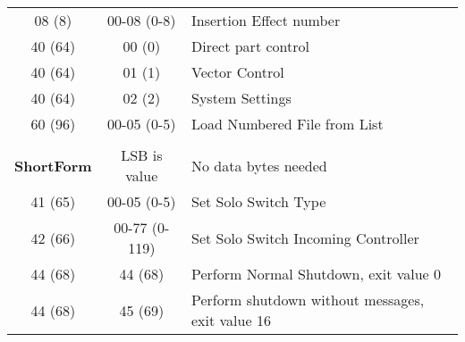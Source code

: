 \begin{table}[H]
\begin{tabular}{c c l}
        08 (8) & 00-08 (0-8)& Insertion Effect number \\
        40 (64) & 00 (0) & Direct part control \\
        40 (64) & 01 (1) & Vector Control \\
        40 (64) & 02 (2) & System Settings \\
        60 (96) & 00-05 (0-5) & Load Numbered File from List \\
        \\
    \textbf{ShortForm} &  LSB is value & No data bytes needed \\
        41 (65) & 00-05 (0-5) & Set Solo Switch Type \\
        42 (66) & 00-77 (0-119) & Set Solo Switch Incoming Controller \\
        44 (68) & 44 (68) & Perform Normal Shutdown, exit value 0 \\
        44 (68) & 45 (69) & Perform shutdown without messages, exit value 16 \\
      \end{tabular}
   \end{table}
\fi


